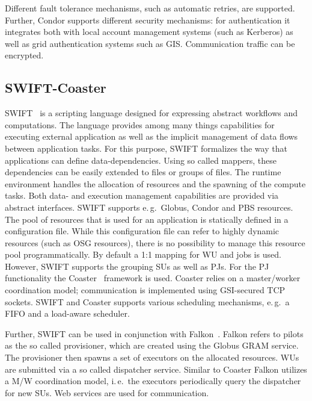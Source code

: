 \documentclass[conference,final]{IEEEtran}
\newcommand{\jhanote}[1]{ {\textcolor{red} { ***shantenu: #1 }}}
\newcommand{\jhanote}[1]{}
\newcommand{\upp}{\vspace*{-0.5em}}
\begin{document}
Different fault tolerance mechanisms, such as automatic retries, are supported.
Further, Condor supports different security mechanisms: for authentication it
integrates both with local account management systems (such as Kerberos) as well
as grid authentication systems such as GIS. Communication traffic can be
encrypted.


\upp
\subsection{SWIFT-Coaster\upp\upp}

SWIFT~\cite{Wilde2011} is a scripting language designed for expressing abstract
workflows and computations. The language provides among many things capabilities
for executing external application as well as the implicit management of data
flows between application tasks. For this purpose, SWIFT formalizes the way that
applications can define data-dependencies. Using so called mappers, these
dependencies can be easily extended to files or groups of files. The runtime
environment handles the allocation of resources and the spawning of the compute
tasks. Both data- and execution management capabilities are provided via
abstract interfaces. SWIFT supports e.\,g.\ Globus, Condor and PBS resources.
The pool of resources that is used for an application is statically defined in a
configuration file. While this configuration file can refer to highly dynamic
resources (such as OSG resources), there is no possibility to manage this
resource pool programmatically. By default a 1:1 mapping for WU and jobs is
used. However, SWIFT supports the grouping SUs as well as PJs. For the PJ
functionality the Coaster~\cite{coasters} framework is used. Coaster relies on a
master/worker coordination model; communication is implemented using GSI-secured
TCP sockets. SWIFT and Coaster supports various scheduling mechanisms, e.\,g.\ 
a FIFO and a load-aware scheduler. 

Further, SWIFT can be used in conjunction with Falkon~\cite{1362680}. Falkon
refers to pilots as the so called provisioner, which are created using the
Globus GRAM service. The provisioner then spawns a set of executors on the
allocated resources. WUs are submitted via a so called dispatcher service.
Similar to Coaster Falkon utilizes a M/W coordination model, i.\,e.\ the
executors periodically query the dispatcher for new SUs. Web services are used
for communication.



\end{document}
